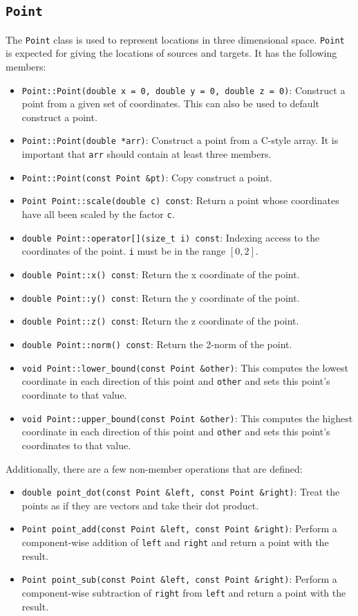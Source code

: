\subsection{{\tt Point}}
The {\tt Point} class is used to represent locations in three dimensional space.
{\tt Point} is expected for giving the locations of sources and targets. It has
the following members:

\begin{itemize}
 \item {\tt Point::Point(double x = 0, double y = 0, double z = 0)}: Construct a
 point from a given set of coordinates. This can also be used to default
 construct a point.
 \item {\tt Point::Point(double *arr)}: Construct a point from a C-style
   array. It is  important that {\tt arr} should contain at least three members.
 \item  {\tt Point::Point(const Point \&pt)}: Copy construct a point.
 \item {\tt Point Point::scale(double c) const}: Return a point whose
   coordinates have  all been scaled by the factor {\tt c}.
 \item {\tt double Point::operator[](size\_t i) const}: Indexing access to the
 coordinates of the point. {\tt i} must be in the range $[0,2]$.
 \item  {\tt double Point::x() const}: Return the x coordinate of the point.
 \item  {\tt double Point::y() const}: Return the y coordinate of the point.
 \item {\tt double Point::z() const}: Return the z coordinate of the point.
 \item  {\tt double Point::norm() const}: Return the 2-norm of the point.
 \item {\tt void Point::lower\_bound(const Point \&other)}: This computes the
   lowest  coordinate in each direction of this point and {\tt other} and sets
   this point's  coordinate to that value.
 \item {\tt void Point::upper\_bound(const Point \&other)}: This computes the
   highest coordinate in each direction of this point and {\tt other} and
   sets this point's coordinates to that value.
\end{itemize}

Additionally, there are a few non-member operations that are defined:

\begin{itemize}
 \item {\tt double point\_dot(const Point \&left, const Point \&right)}: Treat
   the  points as if they are vectors and take their dot product.
 \item {\tt Point point\_add(const Point \&left, const Point \&right)}: Perform
   a  component-wise addition of {\tt left} and {\tt right} and return a point
   with  the result.
 \item {\tt Point point\_sub(const Point \&left, const Point \&right)}:
Perform a component-wise subtraction of {\tt right} from {\tt left} and return a
point  with  the result.
\end{itemize}

